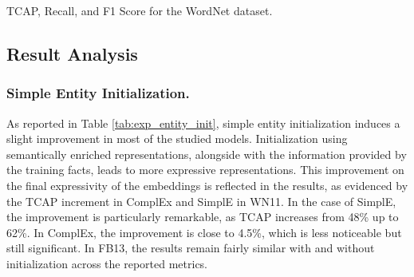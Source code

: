 \begin{table}
\caption{TCAP, Recall, and F1 Score for the WordNet dataset.} \label{tab:ookb_wn}

\caption{Top: (a) metrics obtained for the Freebase dataset. DBOnt refers to the DBpedia ontology, and GKGOnt to the Google Knowledge Graph Ontology. Bottom: (b) metrics obtained for the WordNet dataset. Entity initialization is used in all instances}
\label{tab:OOKB_exp}
\end{table}

\subsection{Result Analysis}\label{4_sec:results}
\subsubsection{Simple Entity Initialization.}
As reported in Table \ref{tab:exp_entity_init}, simple entity initialization induces a slight improvement in most of the studied models. Initialization using semantically enriched representations, alongside with the information provided by the training facts, leads to more expressive representations. This improvement on the final expressivity of the embeddings is reflected in the results, as evidenced by the TCAP increment in ComplEx and SimplE in WN11. In the case of SimplE, the improvement is particularly remarkable, as TCAP increases from 48\% up to 62\%. In ComplEx, the improvement is close to 4.5\%, which is less noticeable but still significant. In FB13, the results remain fairly similar with and without initialization across the reported metrics.

